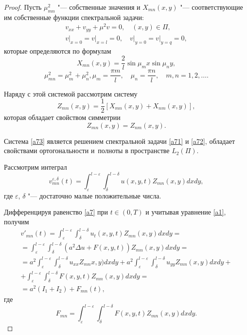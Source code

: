 \begin{proof}
Пусть $\mu_{mn}^2$ "--- собственные значения и $X_{mn}(x,y)$ "--- соответствующие им собственные функции спектральной задачи:
\begin{gather}
\label{a71}v_{xx}+v_{yy}+\mu^2v=0,\quad  (x,y)\in\Pi,
\\
\label{a72}
v\bigl|_{x=0}=v\bigl|_{x=l}=0,\quad  v\bigl|_{y=0}=v\bigl|_{y=q}=0,
\end{gather}
которые определяются по формулам
$$ X_{mn}(x,y)=\frac{2}{l}\sin\mu_mx\sin\mu_ny,$$
$$  \mu_{mn}^2=\mu_m^2+\mu_n^2, \mu_m=\frac{\pi m}{l},\quad  \mu_n=\frac{\pi n}{l},\quad  m, n=1, 2, \ldots.$$

Наряду с этой системой рассмотрим  систему
\begin{equation}\label{a73}Z_{mn}(x,y)=\frac{1}{2}\left[X_{mn}(x,y)+X_{nm}(x,y)\right],\end{equation}
которая обладает свойством симметрии
$$Z_{mn}(x,y)=Z_{nm}(x,y).$$

Система \eqref{a73} является решением спектральной задачи \eqref{a71} и \eqref{a72}, обладает свойствами ортогональности и~полноты в пространстве $L_2(\Pi)$.

Рассмотрим интеграл
\begin{equation}\label{a7}
v_{mn}^{\varepsilon,\delta}(t)=\int_{\varepsilon}^{l-\varepsilon}\int_{\delta}^{l-\delta} u(x,y,t)Z_{mn}(x,y)dxdy,
\end{equation}
где $\varepsilon$, $\delta$ "--- достаточно малые положительные числа.

Дифференцируя равенство \eqref{a7} при $t\in(0, T)$ и учитывая уравнение \eqref{a1}, 
получим
\begin{multline}
\label{a8}
v'_{mn}(t)=\int_{\varepsilon}^{l-\varepsilon}\int_{\delta}^{l-\delta} u_t(x,y,t)Z_{mn}(x,y)dxdy =
\\ 
=\int_{\varepsilon}^{l-\varepsilon}\int_{\delta}^{l-\delta} (a^2\Delta u+ F(x,y,t))Z_{mn}(x,y)dxdy =
\\
=a^2\int_{\varepsilon}^{l-\varepsilon}\int_{\delta}^{l-\delta}u_{xx}Z_{mn} x,y)dxdy+ a^2\int_{\varepsilon}^{l-\varepsilon}\int_{\delta}^{l-\delta} u_{yy}Z_{mn}(x,y)dxdy+
\\
+ \int_{\varepsilon}^{l-\varepsilon}\int_{\delta}^{l-\delta}F(x,y,t)Z_{mn}(x,y)dxdy =
\\
=a^2(I_1+I_2)+F_{mn}(t),
\end{multline}
где
\begin{equation}
\label{b9}
F_{mn}=\int_{\varepsilon}^{l-\varepsilon}\int_{\delta}^{l-\delta}F(x,y,t)Z_{mn}(x,y)dxdy.
\end{equation}


\end{proof}
